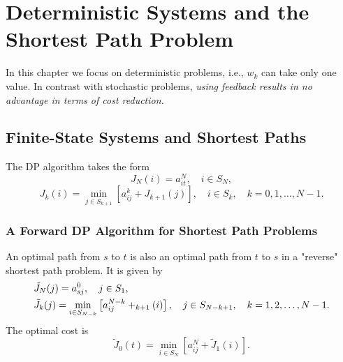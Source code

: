 \chapter{Deterministic Systems and the Shortest Path Problem}
In this chapter we focus on deterministic problems, i.e., $w_k$ can take only one value. In contrast with stochastic problems, \textit{using feedback results in no advantage in terms of cost reduction.} 

\section{Finite-State Systems and Shortest Paths}
The DP algorithm takes the form 
\begin{equation}
    J_N(i)=a_{it}^N,\quad i\in S_N,
\end{equation}
\begin{equation}
    J_k(i)=\min_{j\in S_{k+1}}\left[a_{ij}^k+J_{k+1}(j)\right],\quad i\in S_k,\quad k=0,1,\dots,N-1.
\end{equation}
\subsection*{A Forward DP Algorithm for Shortest Path Problems}
An optimal path from $s$ to $t$ is also an optimal path from $t$ to $s$ in a "reverse" shortest path problem. It is given by 
\begin{align}
    &\tilde{J}_N(j)=a_{sj}^0,\quad j\in S_1,\\
    &\tilde{J}_k(j)=\min_{i\in S_{N-k}}\left[a_{ij}^{N-k}+\title{J}_{k+1}(i)\right],\quad j\in S_{N-k+1},\quad k=1,2,\dots,N-1.
\end{align}
The optimal cost is 
\[\tilde{J}_0(t)=\min_{i\in S_N}\left[a_{ij}^N+\tilde{J}_1(i)\right].\]
 